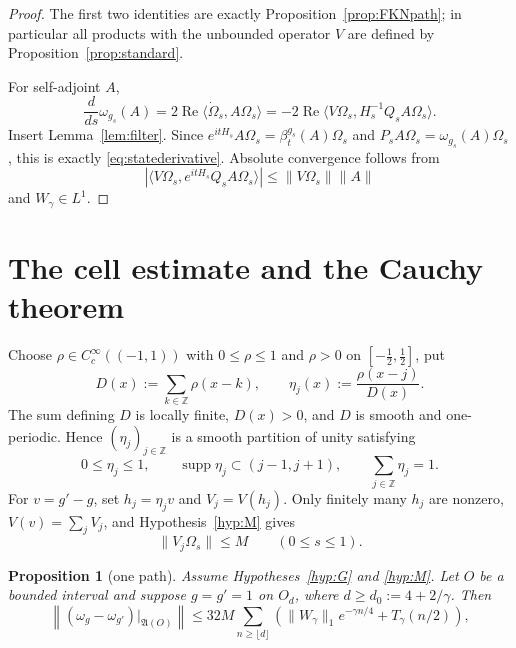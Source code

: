 \documentclass[11pt,a4paper]{article}
\newtheorem{proposition}[theorem]{Proposition}
\theoremstyle{remark}
\newcommand{\A}{\mathfrak A}
\newcommand{\Om}{\Omega}
\DeclareMathOperator{\supp}{supp}
\begin{document}
\begin{proof}
The first two identities are exactly Proposition~\ref{prop:FKNpath}; in particular all products
with the unbounded operator $V$ are defined by Proposition~\ref{prop:standard}.

For self-adjoint $A$,
\[
 \frac d{ds}\omega_{g_s}(A)
 =2\operatorname{Re}\langle\dot\Om_s,A\Om_s\rangle
 =-2\operatorname{Re}\langle V\Om_s,H_s^{-1}Q_sA\Om_s\rangle.
\]
Insert Lemma~\ref{lem:filter}.  Since
$e^{itH_s}A\Om_s=\beta_t^{g_s}(A)\Om_s$ and
$P_sA\Om_s=\omega_{g_s}(A)\Om_s$, this is exactly
\eqref{eq:statederivative}.  Absolute convergence follows from
\[
 \left|\langle V\Om_s,e^{itH_s}Q_sA\Om_s\rangle\right|
 \le\|V\Om_s\|\|A\|
\]
and $W_\gamma\in L^1$.
\end{proof}

\section{The cell estimate and the Cauchy theorem}\label{sec:cauchy}

Choose $\rho\in C_c^\infty((-1,1))$ with $0\le\rho\le1$ and
$\rho>0$ on $[-\tfrac12,\tfrac12]$, put
\[
 D(x):=\sum_{k\in\mathbb Z}\rho(x-k),\qquad
 \eta_j(x):=\frac{\rho(x-j)}{D(x)}.
\]
The sum defining $D$ is locally finite, $D(x)>0$, and $D$ is smooth and one-periodic.  Hence
$(\eta_j)_{j\in\mathbb Z}$ is a smooth partition of unity satisfying
\[
 0\le\eta_j\le1,\qquad \supp\eta_j\subset(j-1,j+1),\qquad
 \sum_{j\in\mathbb Z}\eta_j=1.
\]
For $v=g'-g$, set $h_j=\eta_jv$ and $V_j=V(h_j)$.  Only finitely many $h_j$ are nonzero,
$V(v)=\sum_jV_j$, and Hypothesis~\ref{hyp:M} gives
\begin{equation}\label{eq:cellmoment}
 \|V_j\Om_s\|\le M
 \qquad(0\le s\le1).
\end{equation}

\begin{proposition}[one path]\label{prop:path}
Assume Hypotheses~\ref{hyp:G} and \ref{hyp:M}.  Let $O$ be a bounded interval and suppose
$g=g'=1$ on $O_d$, where $d\ge d_0:=4+2/\gamma$.  Then
\begin{equation}\label{eq:pathbound}
 \left\|(\omega_g-\omega_{g'})|_{\A(O)}\right\|
 \le 32 M\sum_{n\ge\lfloor d\rfloor}
 \left(\|W_\gamma\|_1e^{-\gamma n/4}+T_\gamma(n/2)\right),
\end{equation}
\end{proposition}
\end{document}
